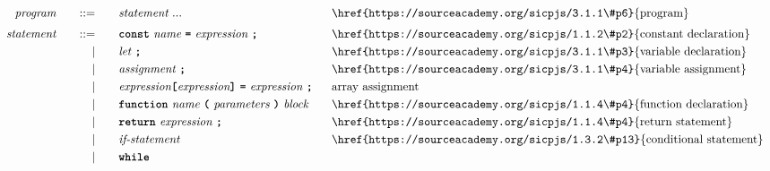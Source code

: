 \begin{alignat*}{9}
&& \textit{program}    &&\quad ::= &\quad && \textit{statement} \ ...
                                                           && \textrm{\href{https://sourceacademy.org/sicpjs/3.1.1\#p6}{program}} \\[1mm]
&& \textit{statement}    &&\quad ::= &\quad && \textbf{\texttt{const}}\  \textit{name} \ 
                                           \textbf{\texttt{=}}\  \textit{expression} \ \textbf{\texttt{;}}
                                                           && \textrm{\href{https://sourceacademy.org/sicpjs/1.1.2\#p2}{constant declaration}} \\
&&                       && |   &\quad && \textit{let} \ \textbf{\texttt{;}}
                                                           && \textrm{\href{https://sourceacademy.org/sicpjs/3.1.1\#p3}{variable declaration}} \\
&&                       && |   &\quad && \textit{assignment} \ \textbf{\texttt{;}}
                                                           && \textrm{\href{https://sourceacademy.org/sicpjs/3.1.1\#p4}{variable assignment}} \\
&&                       && |   &\quad && \textit{expression} \textbf{\texttt{[}}
                                          \textit{expression} \textbf{\texttt{]}} \ 
                                           \textbf{\texttt{=}}\  \textit{expression} \ \textbf{\texttt{;}}
                                                           && \textrm{array assignment} \\
&&                       && |   &\quad && \textbf{\texttt{function}}\  \textit{name} \ 
                                   \textbf{\texttt{(}}\  \textit{parameters} \ \textbf{\texttt{)}}\ \textit{block} \quad
                                                           && \textrm{\href{https://sourceacademy.org/sicpjs/1.1.4\#p4}{function declaration}}\\
&&                       && |   &\quad && \textbf{\texttt{return}}\  \textit{expression} \ \textbf{\texttt{;}}
                                                           && \textrm{\href{https://sourceacademy.org/sicpjs/1.1.4\#p4}{return statement}}\\
&&                       && |   &\quad && \textit{if-statement} \quad
                                                           && \textrm{\href{https://sourceacademy.org/sicpjs/1.3.2\#p13}{conditional statement}}\\
&&                       && |   &\quad && \textbf{\texttt{while}}\  

\end{alignat*}
